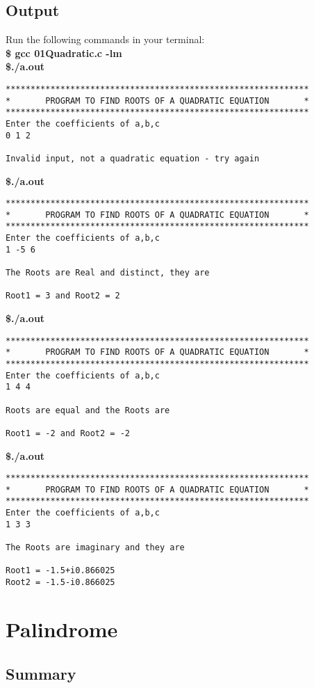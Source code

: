 \documentclass[a4paper]{report}
\begin{document}
\section*{Output}
Run the following commands in your terminal:\\
\textbf{\$ gcc 01Quadratic.c -lm \\ \$./a.out }
\begin{Verbatim}
*************************************************************
*       PROGRAM TO FIND ROOTS OF A QUADRATIC EQUATION       *
*************************************************************
Enter the coefficients of a,b,c 
0 1 2

Invalid input, not a quadratic equation - try again
\end{Verbatim}
\textbf{\$./a.out }
\begin{Verbatim}
*************************************************************
*       PROGRAM TO FIND ROOTS OF A QUADRATIC EQUATION       *
*************************************************************
Enter the coefficients of a,b,c 
1 -5 6

The Roots are Real and distinct, they are 

Root1 = 3 and Root2 = 2
\end{Verbatim}
\textbf{\$./a.out }
\begin{Verbatim}
*************************************************************
*       PROGRAM TO FIND ROOTS OF A QUADRATIC EQUATION       *
*************************************************************
Enter the coefficients of a,b,c 
1 4 4

Roots are equal and the Roots are 

Root1 = -2 and Root2 = -2
\end{Verbatim}
\textbf{\$./a.out }
\begin{Verbatim}
*************************************************************
*       PROGRAM TO FIND ROOTS OF A QUADRATIC EQUATION       *
*************************************************************
Enter the coefficients of a,b,c 
1 3 3

The Roots are imaginary and they are

Root1 = -1.5+i0.866025
Root2 = -1.5-i0.866025
\end{Verbatim}

\chapter{Palindrome}
\section*{Summary}
\end{document}
